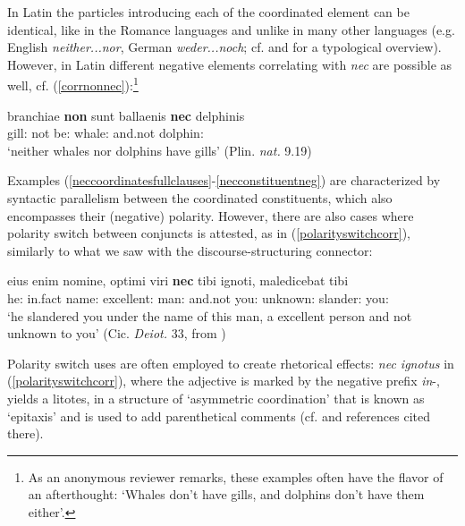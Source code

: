 \documentclass[output=paper,modfonts,nonflat,citecolor=brown,
showindex
]{langsci/langscibook}
\begin{document}
\noindent In Latin the particles introducing each of the coordinated element can be identical, like in the Romance languages and unlike in many other languages (e.g. English {\em{neither...nor}}, German {\em{weder...noch}}; cf. \citealt[100-106]{BerniniRamat96} and \citealt{Haspelmath07} for a typological overview). However, in Latin different negative elements correlating with {\em{nec}} are possible as well, cf. (\ref{corrnonnec}):{\footnote{As an anonymous reviewer remarks, these examples often have the flavor of an afterthought: `Whales don't have gills, and dolphins don't have them either'.}}

{\begin{exe}
\ex \label{corrnonnec} \gll branchiae {\bf{non}} sunt ballaenis {\bf{nec}} delphinis\\
gill:{} not be:{} whale:{} and.not dolphin:{}\\

`neither whales nor dolphins have gills' (Plin. {\em{nat.}} 9.19)
\end{exe}}

\noindent Examples (\ref{neccoordinatesfullclauses}-\ref{necconstituentneg}) are characterized by syntactic parallelism between the coordinated constituents, which also encompasses their (negative) polarity. However, there are also cases where polarity switch between conjuncts is attested, as in (\ref{polarityswitchcorr}), similarly to what we saw with the discourse-structuring connector:

{\begin{exe}
\ex \label{polarityswitchcorr} \gll eius enim nomine, optimi viri {\bf{nec}} tibi ignoti, maledicebat tibi\\
he:{} in.fact name:{} excellent:{} man:{} and.not you:{} unknown:{} slander:{} you:{}\\

`he slandered you under the name of this man, a excellent person and not unknown to you' (Cic. {\em{Deiot.}} 33, from \citealt[688]{Pinkster15})
\end{exe}}

\noindent Polarity switch uses are often employed to create rhetorical effects: {\em{nec ignotus}} in (\ref{polarityswitchcorr}), where the adjective is marked by the negative prefix {\em{in}}-, yields a litotes, in a structure of `asymmetric coordination' that is known as `epitaxis' and is used to add parenthetical comments (cf. \citealt[]{OrlandiniPoccetti07} and references cited there). 
\end{document}
